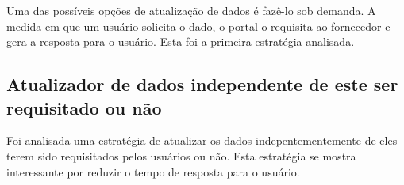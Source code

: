 Uma das possíveis opções de atualização de dados é fazê-lo sob demanda. A medida em que um usuário solicita o dado, o portal o requisita ao fornecedor e gera a resposta para o usuário. Esta foi a primeira estratégia analisada.

\subsection{Atualizador de dados independente de este ser requisitado ou não}

Foi analisada uma estratégia de atualizar os dados indepentementemente de eles terem sido requisitados pelos usuários ou não. Esta estratégia se mostra interessante por reduzir o tempo de resposta para o usuário.

